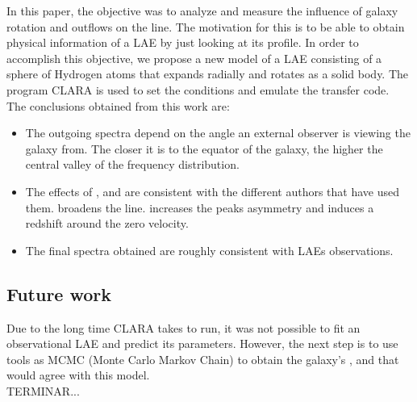 \documentclass[twocolappendix]{latex/emulateapj}
\begin{document}
In this paper, the objective was to analyze and measure the influence of galaxy rotation and outflows on the \lya line. The motivation for this is to be able to obtain physical information of a LAE by just looking at its \lya profile. In order to accomplish this objective, we propose a new model of a LAE consisting of a sphere of Hydrogen atoms that expands radially and rotates as a solid body. The program CLARA \cite{CLARA} is used to set the conditions and emulate the transfer code. \\

The conclusions obtained from this work are: \\

\begin{itemize}
	\item The outgoing spectra depend on the angle an external observer is viewing the galaxy from. The closer it is to the equator of the galaxy, the higher the central valley of the frequency distribution. \\
	
	\item The effects of \vrot, \vout and \tauh are consistent with the different authors that have used them. \vrot broadens the \lya line. \vout increases the peaks asymmetry and \tauh induces a redshift around the zero velocity.\\
	
	\item The final spectra obtained are roughly consistent with LAEs observations.  \\
	
\end{itemize}

\subsection{Future work}



Due to the long time CLARA takes to run, it was not possible to fit an observational LAE and predict its parameters. However, the next step is to use tools as MCMC (Monte Carlo Markov Chain) to obtain the galaxy's \tauh, \vrot and \vout that would agree with this model. \\

TERMINAR...\\
\end{document}
